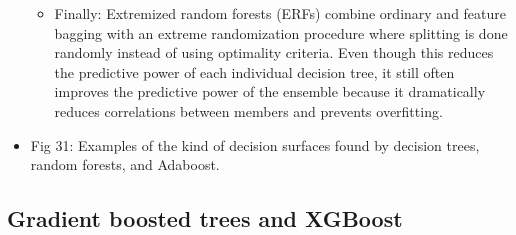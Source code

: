 \documentclass[norsk,a4paper,11pt]{article}
\begin{document}
\begin{itemize}
\begin{itemize}
		\item Finally: Extremized random forests (ERFs) combine ordinary and feature bagging with an extreme randomization procedure where splitting is done randomly instead of using optimality criteria. Even though this reduces the predictive power of each individual decision tree, it still often improves the predictive power of the ensemble because it dramatically reduces correlations between members and prevents overfitting.
	\end{itemize} 
	\item Fig 31: Examples of the kind of decision surfaces found by decision trees, random forests, and Adaboost.
\end{itemize}

\subsection{Gradient boosted trees and XGBoost}
\end{document}

